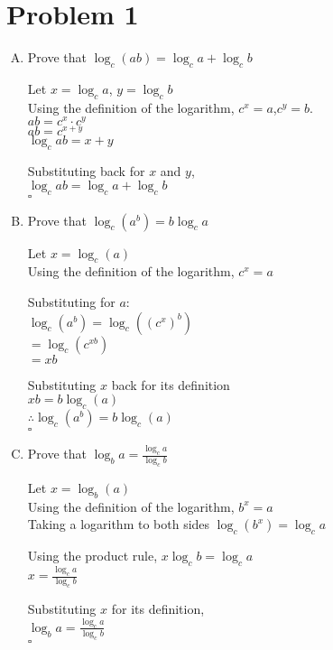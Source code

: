 \clearpage
\section*{Problem 1}
\begin{enumerate}[A.]
    \item Prove that $\displaystyle\log_{c}(ab)=\log_{c}a+\log_{c}b$
    
    Let $x=\log_{c}a$, $y=\log_{c}b$\\
    Using the definition of the logarithm, $c^x=a$,$c^y=b$.\\
    $ab=c^x\cdot c^y$\\
    $ab=c^{x+y}$\\
    $\log_c{ab}=x+y$
    
    Substituting back for $x$ and $y$,\\
    $\log_c{ab}=\log_{c}a+\log_{c}b$\\
    $\square$
    
    \item Prove that $\displaystyle\log_{c}(a^{b})=b\log_{c}a$
    
    Let $x=\log_{c}(a)$\\
    Using the definition of the logarithm, $c^x=a$
    
    Substituting for $a$:\\
    $\log_{c}(a^{b})=\log_{c}((c^{x})^{b})$\\
    $=\log_{c}(c^{xb})$\\
    $=xb$
    
    Substituting $x$ back for its definition\\
    $xb=b\log_{c}(a)$\\
    $\therefore\log_{c}(a^{b})=b\log_{c}(a)$\\
    $\square$
    
    \item Prove that $\displaystyle\log_{b}a=\frac{\log_{c}a}{\log_{c}b}$
    
    Let $x=\log_{b}(a)$\\
    Using the definition of the logarithm, $b^{x}=a$\\
    Taking a logarithm to both sides $\log_{c}(b^{x})=\log_{c}a$
    
    Using the product rule, $x\log_{c}b=\log_{c}a$\\
    $\displaystyle x=\frac{\log_{c}a}{\log_{c}b}$
    
    Substituting $x$ for its definition,\\
    $\displaystyle\log_{b}a=\frac{\log_{c}a}{\log_{c}b}$\\
    $\square$
    
\end{enumerate}
